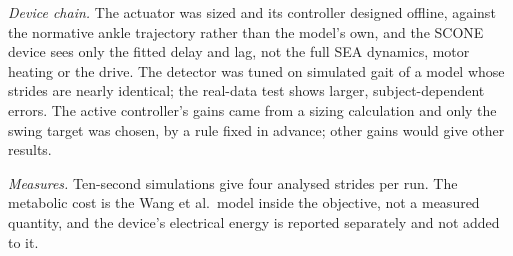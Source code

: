 \emph{Device chain.} The actuator was sized and its controller designed offline, against the normative ankle trajectory rather than the model's own, and the SCONE device sees only the fitted delay and lag, not the full SEA dynamics, motor heating or the drive. The detector was tuned on simulated gait of a model whose strides are nearly identical; the real-data test shows larger, subject-dependent errors. The active controller's gains came from a sizing calculation and only the swing target was chosen, by a rule fixed in advance; other gains would give other results.

\emph{Measures.} Ten-second simulations give four analysed strides per run. The metabolic cost is the Wang et al.\ model \cite{wang2012} inside the objective, not a measured quantity, and the device's electrical energy is reported separately and not added to it.
